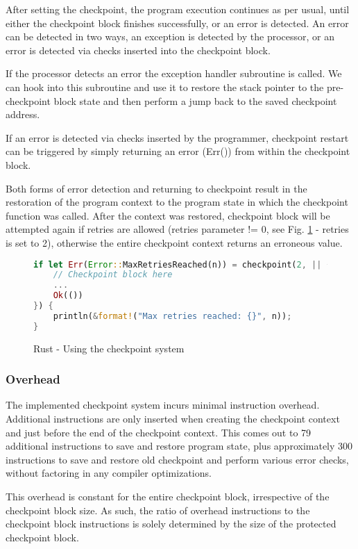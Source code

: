 After setting the checkpoint, the program execution continues as per usual, until either the checkpoint block finishes successfully, or an error is detected. An error can be detected in two ways, an exception is detected by the processor, or an error is detected via checks inserted into the checkpoint block.

If the processor detects an error the exception handler subroutine is called. We can hook into this subroutine and use it to restore the stack pointer to the pre-checkpoint block state and then perform a jump back to the saved checkpoint address.

If an error is detected via checks inserted by the programmer, checkpoint restart can be triggered by simply returning an error (Err()) from within the checkpoint block.

Both forms of error detection and returning to checkpoint result in the restoration of the program context to the program state in which the checkpoint function was called. After the context was restored, checkpoint block will be attempted again if retries are allowed (retries parameter != 0, see Fig. \ref{fig:rust_using_checkpoint} - retries is set to 2), otherwise the entire checkpoint context returns an erroneous value.

\begin{figure}[!h]
\begin{lstlisting}[language=Rust]
if let Err(Error::MaxRetriesReached(n)) = checkpoint(2, || {
    // Checkpoint block here
    ...
    Ok(())
}) {
    println(&format!("Max retries reached: {}", n));
}
\end{lstlisting}
\caption{Rust - Using the checkpoint system}
\label{fig:rust_using_checkpoint}
\end{figure}

\subsubsection{Overhead}

The implemented checkpoint system incurs minimal instruction overhead. Additional instructions are only inserted when creating the checkpoint context and just before the end of the checkpoint context. This comes out to 79 additional instructions to save and restore program state, plus approximately 300 instructions to save and restore old checkpoint and perform various error checks, without factoring in any compiler optimizations.

This overhead is constant for the entire checkpoint block, irrespective of the checkpoint block size. As such, the ratio of overhead instructions to the checkpoint block instructions is solely determined by the size of the protected checkpoint block.

